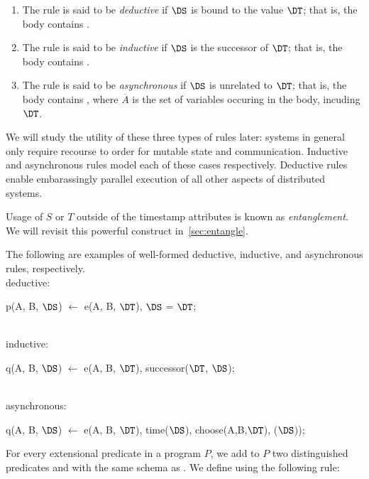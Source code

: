 \begin{enumerate}
%
\item The rule is said to be {\em deductive} if $\DS$ is bound to the
value $\DT$; that is, the body contains \dedalus{$\DS$ = $\DT$}.
%
\item The rule is said to be {\em inductive} if $\DS$ is the successor of
$\DT$; that is, the body contains .
%
\item The rule is said to be {\em asynchronous} if $\DS$ is unrelated to $\DT$;
that is, the body contains , where $\overline{A}$ is the set of variables occuring in the body, incuding $\DT$.
\end{enumerate}

We will study the utility of these three types of rules later: systems in general only require recourse to order for mutable state and communication.  Inductive and asynchronous rules model each of these cases respectively.  Deductive rules enable embarassingly parallel execution of all other aspects of distributed systems. 

Usage of $S$ or $T$ outside of the timestamp attributes is known as {\em entanglement}.  We will revisit this powerful construct in~\ref{sec:entangle}. 

\begin{example}
The following are examples of well-formed deductive, inductive, and asynchronous rules, respectively.
\\
deductive:
\begin{Dedalus}
p(A, B, \(\DS\)) \(\leftarrow\) e(A, B, \(\DT\)), \(\DS\) = \(\DT\);
\end{Dedalus}
\\
inductive:
\begin{Dedalus}
q(A, B, \(\DS\)) \(\leftarrow\) e(A, B, \(\DT\)), successor(\(\DT\), \(\DS\));
\end{Dedalus}
\\
asynchronous:
\begin{Dedalus}
q(A, B, \(\DS\)) \(\leftarrow\) e(A, B, \(\DT\)), time(\(\DS\)), choose(A,B,\(\DT\)), (\(\DS\)));
\end{Dedalus}
\end{example}

For every extensional predicate  in a \lang program $P$, we add to
$P$ two distinguished predicates  and  with the same schema
as .  We define  using the following rule:

